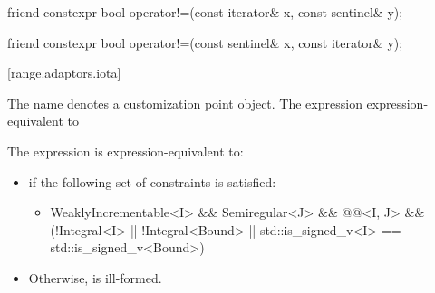 {
\begin{itemdecl}
friend constexpr bool operator!=(const iterator& x, const sentinel& y);
\end{itemdecl}

\begin{itemdescr}
\pnum
\oldtxt{\returns} 
\end{itemdescr}

\begin{itemdecl}
friend constexpr bool operator!=(const sentinel& x, const iterator& y);
\end{itemdecl}

\begin{itemdescr}
\pnum
\oldtxt{\returns} 
\end{itemdescr}

[range.adaptors.iota]{}

\pnum
The name  denotes a customization point
object.
The expression    expression-equivalent to
 

{\color{oldclr}
\pnum
The expression  is expression-equivalent to:

\begin{itemize}
\item {} if the following set of constraints
is satisfied:
\begin{itemize}
\item \begin{codeblock}
WeaklyIncrementable<I> && Semiregular<J> &&
@@<I, J> &&
(!Integral<I> || !Integral<Bound> || std::is_signed_v<I> == std::is_signed_v<Bound>)
\end{codeblock}
\end{itemize}
\item Otherwise,  is ill-formed.
\end{itemize}
} %

}
